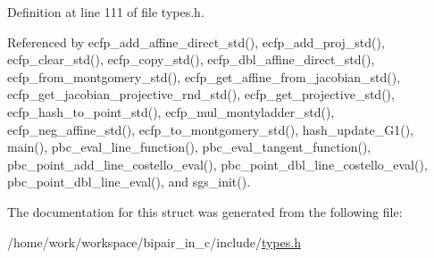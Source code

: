 Definition at line 111 of file types.\-h.



Referenced by ecfp\-\_\-add\-\_\-affine\-\_\-direct\-\_\-std(), ecfp\-\_\-add\-\_\-proj\-\_\-std(), ecfp\-\_\-clear\-\_\-std(), ecfp\-\_\-copy\-\_\-std(), ecfp\-\_\-dbl\-\_\-affine\-\_\-direct\-\_\-std(), ecfp\-\_\-from\-\_\-montgomery\-\_\-std(), ecfp\-\_\-get\-\_\-affine\-\_\-from\-\_\-jacobian\-\_\-std(), ecfp\-\_\-get\-\_\-jacobian\-\_\-projective\-\_\-rnd\-\_\-std(), ecfp\-\_\-get\-\_\-projective\-\_\-std(), ecfp\-\_\-hash\-\_\-to\-\_\-point\-\_\-std(), ecfp\-\_\-mul\-\_\-montyladder\-\_\-std(), ecfp\-\_\-neg\-\_\-affine\-\_\-std(), ecfp\-\_\-to\-\_\-montgomery\-\_\-std(), hash\-\_\-update\-\_\-\-G1(), main(), pbc\-\_\-eval\-\_\-line\-\_\-function(), pbc\-\_\-eval\-\_\-tangent\-\_\-function(), pbc\-\_\-point\-\_\-add\-\_\-line\-\_\-costello\-\_\-eval(), pbc\-\_\-point\-\_\-dbl\-\_\-line\-\_\-costello\-\_\-eval(), pbc\-\_\-point\-\_\-dbl\-\_\-line\-\_\-eval(), and sgs\-\_\-init().



The documentation for this struct was generated from the following file\-:\begin{DoxyCompactItemize}
\item 
/home/work/workspace/bipair\-\_\-in\-\_\-c/include/\hyperlink{types_8h}{types.\-h}\end{DoxyCompactItemize}
